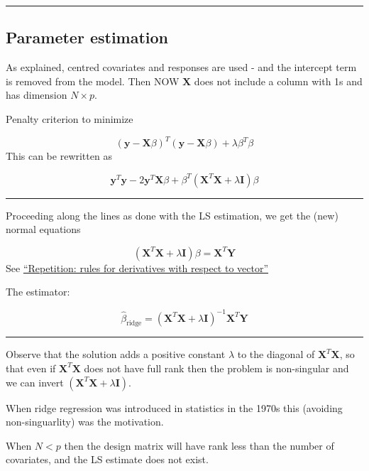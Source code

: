 \documentclass[
  letterpaper,
  DIV=11,
  numbers=noendperiod]{scrartcl}
\begin{document}
\begin{center}\rule{0.5\linewidth}{0.5pt}\end{center}

\hypertarget{parameter-estimation}{%
\subsection{Parameter estimation}\label{parameter-estimation}}

As explained, centred covariates and responses are used - and the
intercept term is removed from the model. Then NOW \({\mathbf X}\) does
not include a column with 1s and has dimension \(N \times p\).

Penalty criterion to minimize

\[ ({\mathbf y}-{\mathbf X}\beta)^T ({\mathbf y}-{\mathbf X}\beta)+ \lambda \beta^T \beta \]
This can be rewritten as

\[ {\mathbf y}^T{\mathbf y}-2{\mathbf y}^T{\mathbf X}\beta+\beta^T({\mathbf X}^T{\mathbf X}+\lambda {\mathbf I})\beta\]

\begin{center}\rule{0.5\linewidth}{0.5pt}\end{center}

Proceeding along the lines as done with the LS estimation, we get the
(new) normal equations

\[ ({\mathbf X}^T{\mathbf X}+\lambda {\mathbf I})\beta= {\mathbf X}^T {\mathbf Y}\]
See
\href{https://www.math.ntnu.no/emner/TMA4315/2018h/2MLR.html}{``Repetition:
rules for derivatives with respect to vector''}

The estimator:

\[ \hat{\beta}_{\text{ridge}}=({\mathbf X}^T{\mathbf X}+\lambda {\mathbf I})^{-1} {\mathbf X}^T {\mathbf Y}\]

\begin{center}\rule{0.5\linewidth}{0.5pt}\end{center}

Observe that the solution adds a positive constant \(\lambda\) to the
diagonal of \({\mathbf X}^T{\mathbf X}\), so that even if
\({\mathbf X}^T{\mathbf X}\) does not have full rank then the problem is
non-singular and we can invert
\(({\mathbf X}^T{\mathbf X}+\lambda {\mathbf I})\).

When ridge regression was introduced in statistics in the 1970s this
(avoiding non-singuarlity) was the motivation.

When \(N<p\) then the design matrix will have rank less than the number
of covariates, and the LS estimate does not exist.
\end{document}
